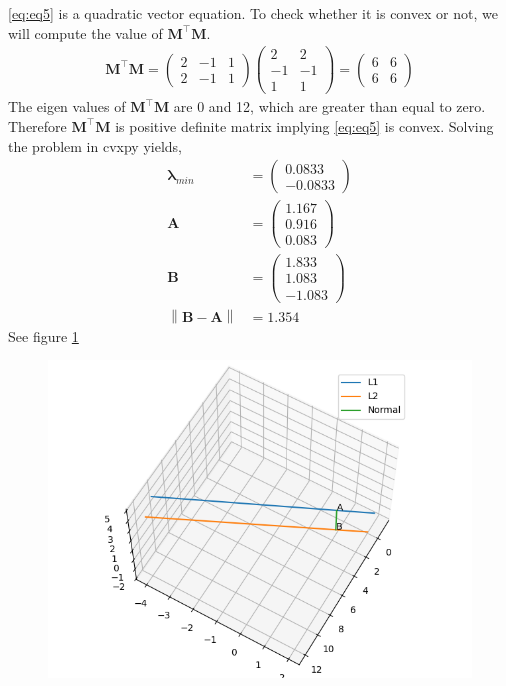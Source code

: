 \documentclass[12pt]{article}
\providecommand{\norm}[1]{\left\lVert#1\right\rVert}
\newcommand{\myvec}[1]{\ensuremath{\begin{pmatrix}#1\end{pmatrix}}}
\let\vec\mathbf
\begin{document}
\eqref{eq:eq5} is a quadratic vector equation. To check whether it is convex or not, we will compute the value of $\vec{M}^\top\vec{M}$.
\begin{align}
	\vec{M}^\top\vec{M} = \myvec{2&-1&1\\2&-1&1}\myvec{2&2\\-1&-1\\1&1} = \myvec{6&6\\6&6}
\end{align}
The eigen values of $\vec{M}^\top\vec{M}$ are 0 and 12, which are greater than equal to zero. Therefore $\vec{M}^\top\vec{M}$ is positive definite matrix implying \eqref{eq:eq5} is convex. Solving the problem in cvxpy yields,
\begin{align}
	\vec{\lambda}_{min} &= \myvec{0.0833\\-0.0833}\\
	\vec{A} &= \myvec{1.167\\0.916\\0.083}\\
	\vec{B} &= \myvec{1.833\\1.083\\-1.083}\\
	\norm{\vec{B}-\vec{A}} &= 1.354
\end{align}
See figure \ref{fig:Fig1}
\begin{figure}[!h]
	\begin{center} 
	    \includegraphics[width=\columnwidth]{figs/jee_q26}
	\end{center}
\caption{}
\label{fig:Fig1}
\end{figure}
\end{document}
